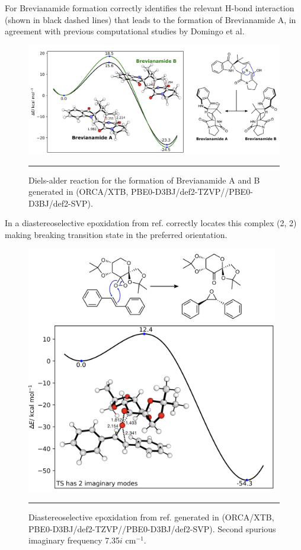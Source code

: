 \documentclass[../../main.tex]{subfiles}
\begin{document}
For Brevianamide formation \ade correctly identifies the relevant H-bond interaction (shown in black dashed lines) that leads to the formation of Brevianamide A, in agreement with previous computational studies by Domingo et al.\cite{Domingo1997}

\begin{figure}[h!]
	\vspace{0.4cm}
	\centering
	\includegraphics[width=\textwidth]{5/autode/figs/figS25}
	\vspace{0.2cm}
	\hrule
	\caption{Diels-alder reaction for the formation of Brevianamide A and B generated in \ade (ORCA/XTB, PBE0-D3BJ/def2-TZVP//PBE0-D3BJ/def2-SVP).}
	\label{fig::ade_si_25}
\end{figure}

In a diastereoselective epoxidation from ref.\cite{Schneebeli2009} \ade correctly locates this complex (2, 2) making breaking transition state in the preferred orientation.


\begin{figure}[h!]
	\vspace{0.4cm}
	\centering
	 \includegraphics[width=11cm]{5/autode/figs/figS26}
	\vspace{0.2cm}
	\hrule
	\caption{Diastereoselective epoxidation from ref. \cite{Schneebeli2009} generated in \ade (ORCA/XTB, PBE0-D3BJ/def2-TZVP//PBE0-D3BJ/def2-SVP). Second spurious imaginary frequency 7.35$i \text{ cm}^{-1}$.}
	\label{fig::ade_si_26}
\end{figure}

\fi


\clearpage
\end{document}
